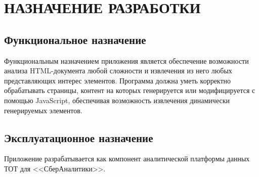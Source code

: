 \section{НАЗНАЧЕНИЕ РАЗРАБОТКИ}

\subsection{Функциональное назначение}

Функциональным назначением приложения является обеспечение возможности анализа HTML-документа любой сложности и извлечения из него любых представляющих интерес элементов. Программа должна уметь корректно обрабатывать страницы, контент на которых генерируется или модифицируется с помощью JavaScript, обеспечивая возможность извлечения динамически генерируемых элементов.

\subsection{Эксплуатационное назначение}

Приложение разрабатывается как компонент аналитической платформы данных ТОТ для <<СберАналитики>>.
